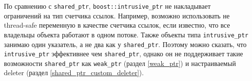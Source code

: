 По сравнению с \texttt{shared_ptr}, \texttt{boost::intrusive_ptr} не накладывает ограничений на тип счетчика ссылок. Например, возможно использовать не thread-safe переменную в качестве счетчика ссылок, если известно, что все владельцы объекта работают в одном потоке. Также объекты типа \texttt{intrusive_ptr} занимаю один указатель, а не два как у \texttt{shared_ptr}. Поэтому можно сказать, что \texttt{intrusive_ptr} эффективнее чем \texttt{shared_ptr}, однако он не поддерживает такие возможности \texttt{shared_ptr} как \texttt{weak_ptr} (раздел \ref{weak_ptr}) и настраиваемый deleter (раздел \ref{shared_ptr_custom_deleter}).
